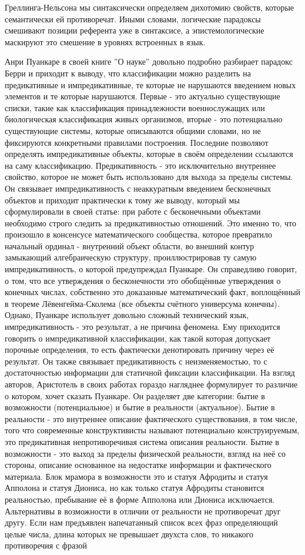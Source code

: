 \documentclass[12pt]{article}
\begin{document}
Греллинга-Нельсона мы синтаксически определяем дихотомию свойств, которые семантически ей противоречат. Иными словами, логические парадоксы смешивают позиции референта уже в синтаксисе, а эпистемологические маскируют это смешение в уровнях встроенных в язык. 

Анри Пуанкаре в своей книге ''О науке'' довольно подробно разбирает парадокс Берри \cite{poincare-berry} и приходит к выводу, что классификации можно разделить на предикативные и импредикативные, те которые не нарушаются введением новых элементов и те которые нарушаются. Первые - это актуально существующие списки, такие как классификация принадлежности военнослужащих или биологическая классификация живых организмов, вторые - это потенциально существующие системы, которые описываются общими словами, но не фиксируются конкретными правилами построения. Последние позволяют определять импредикативные объекты, которые в своём определении ссылаются на саму классификацию. Предикативность - это исключительно внутреннее свойство, которое не может быть использовано для выхода за пределы системы. Он связывает импредикативность с неаккуратным введением бесконечных объектов и приходит практически к тому же выводу, который мы сформулировали в своей статье: при работе с бесконечными объектами необходимо строго следить за предикативностью отношений. Это именно то, что произошло в консенсусе математического сообщества, которое превратило начальный ординал - внутренний объект области, во внешний контур замыкающий алгебраическую структуру, проиллюстрировав ту самую импредикативность, о которой предупреждал Пуанкаре. Он справедливо говорит, о том, что все утверждения о бесконечности это обобщённые утверждения о конечных числах, собственно это доказанные математический факт, воплощённый в теореме Лёвенгейма-Сколема (все объекты счётного универсума конечны). Однако, Пуанкаре использует довольно сложный технический язык, импредикативность - это результат, а не причина феномена. Ему приходится говорить о импредикативной классификации, как такой которая допускает порочные определения, то есть фактически денотировать причину через её результат. Он также связывает предикативность с неизменяемостью, то с достаточностью информации для статичной фиксации классификации. На взгляд авторов, Аристотель в своих работах гораздо нагляднее формулирует то различие о котором, хочет сказать Пуанкаре. Он разделяет две категории: бытие в возможности (потенциальное) и бытие в реальности (актуальное). Бытие в реальности - это внутреннее описание фактического существования, в том числе, того что современные конструктивисты называют потенциально конструируемым, это предикативная непротиворечивая система описания реальности. Бытие в возможности - это выход за пределы физической реальности, взгляд на неё со стороны, описание основанное на недостатке информации и фактического материала. Блок мрамора в возможности это и статуя Афродиты и статуя Апполона и статуя Диониса, но как только статуя Афродиты становится реальностью, пребывание её в форме Апполона или Диониса исключается. Альтернативы в возможности в отличии от реальности не противоречат друг другу. Если нам предъявлен напечатанный список всех фраз определяющий целые числа, длина которых не превышает двухста слов, то никакого противоречия с фразой 
\end{document}
